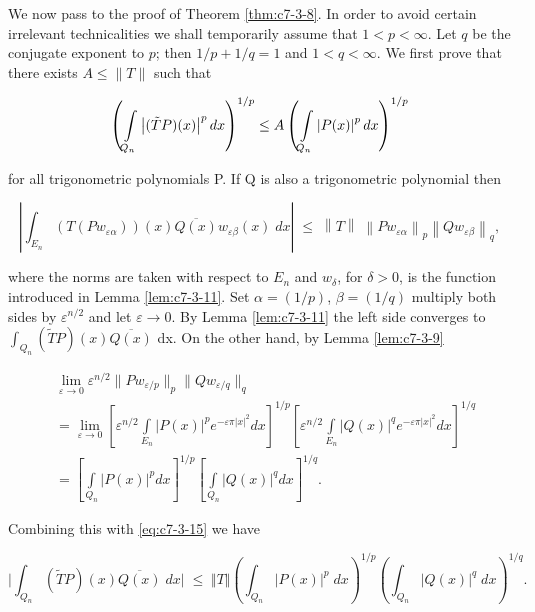 We now pass to the proof of Theorem \ref{thm:c7-3-8}. In order to avoid certain irrelevant technicalities we shall temporarily assume that $1 < p < \infty$. Let $q$ be the conjugate exponent to $p$; then $1/p + 1/q = 1$ and $1 < q < \infty$. We first prove that there exists $A \leq \|T\|$ such that

\begin{equation}\label{eq:c7-3-14}
\left(\intop_{Q_{n}}\left|(\tilde{T}P)(x)\right|^{p}d x\right)^{1/p}\leq A\left(\intop_{Q_{n}}\left|P(x)\right|^{p}d x\right)^{1/p}
\end{equation}

for all trigonometric polynomials P. If Q is also a trigonometric polynomial then

\begin{equation}\label{eq:c7-3-15}
\left|\int_{E_{n}}{(T(P w_{\varepsilon\alpha}))(x)\overline{{Q(x)}}w_{\varepsilon\beta}(x)\;}d x\right|\;\leq\;\left\|T\right\|\;\left\|P w_{\varepsilon\alpha}\right\|_{p}\left\|Q w_{\varepsilon\beta}\right\|_{q},
\end{equation}

where the norms are taken with respect to $E_n$ and $w_\delta$, for $\delta > 0$, is the function introduced in Lemma \ref{lem:c7-3-11}. Set $\alpha = (1/p)$, $\beta = (1/q)$ multiply both sides by $\varepsilon^{n/2}$ and let $\varepsilon \to 0$. By Lemma \ref{lem:c7-3-11} the left side converges to $\int_{Q_n}(\tilde{T}P)(x)\overline{Q(x)}$ dx. On the other hand, by Lemma \ref{lem:c7-3-9}

\[
\begin{aligned}&\lim_{\varepsilon\to0}\varepsilon^{n/2}\big\|P w_{\varepsilon/p}\big\|_{p}\big\|Q w_{\varepsilon/q}\big\|_{q}\\&=\lim_{\varepsilon\to0}\left[\varepsilon^{n/2}\int\limits_{E_{n}}\big|P(x)\big|^{p} e^{-\varepsilon\pi|x|^{2}}dx\right]^{1/p}\left[\varepsilon^{n/2}\int\limits_{E_{n}}\big|Q(x)\big|^{q} e^{-\varepsilon\pi|x|^{2}}dx\right]^{1/q}\\&=\left[\int\limits_{Q_{n}}\big|P(x)\big|^{p} dx\right]^{1/p}\left[\int\limits_{Q_{n}}\big|Q(x)\big|^{q} dx\right]^{1/q}.\end{aligned}
\]

Combining this with \eqref{eq:c7-3-15} we have

\[
\bigg|\int_{Q_{n}}(\widetilde T P)(x)\overline{{Q(x)}}\;d x\bigg|\;\leq\;\Vert T\Vert\left(\int_{Q_{n}}\vert P(x)\vert^{p}\;d x\right)^{1/p}\left(\int_{Q_{n}}\vert Q(x)\vert^{q}\;d x\right)^{1/q}.
\]

